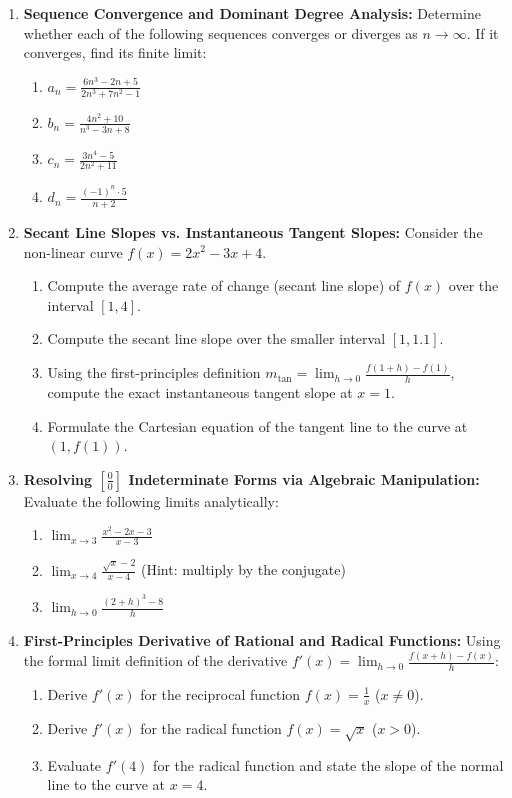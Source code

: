 \begin{enumerate}
    \item \textbf{Sequence Convergence and Dominant Degree Analysis:} Determine whether each of the following sequences converges or diverges as $n \to \infty$. If it converges, find its finite limit:
    \begin{enumerate}
        \item $a_n = \frac{6n^3 - 2n + 5}{2n^3 + 7n^2 - 1}$
        \item $b_n = \frac{4n^2 + 10}{n^3 - 3n + 8}$
        \item $c_n = \frac{3n^4 - 5}{2n^2 + 11}$
        \item $d_n = \frac{(-1)^n \cdot 5}{n + 2}$
    \end{enumerate}

    \item \textbf{Secant Line Slopes vs. Instantaneous Tangent Slopes:} Consider the non-linear curve $f(x) = 2x^2 - 3x + 4$.
    \begin{enumerate}
        \item Compute the average rate of change (secant line slope) of $f(x)$ over the interval $[1, 4]$.
        \item Compute the secant line slope over the smaller interval $[1, 1.1]$.
        \item Using the first-principles definition $m_{\text{tan}} = \lim_{h \to 0} \frac{f(1+h) - f(1)}{h}$, compute the exact instantaneous tangent slope at $x = 1$.
        \item Formulate the Cartesian equation of the tangent line to the curve at $(1, f(1))$.
    \end{enumerate}

    \item \textbf{Resolving $\left[\frac{0}{0}\right]$ Indeterminate Forms via Algebraic Manipulation:} Evaluate the following limits analytically:
    \begin{enumerate}
        \item $\lim_{x \to 3} \frac{x^2 - 2x - 3}{x - 3}$
        \item $\lim_{x \to 4} \frac{\sqrt{x} - 2}{x - 4}$ (Hint: multiply by the conjugate)
        \item $\lim_{h \to 0} \frac{(2 + h)^3 - 8}{h}$
    \end{enumerate}

    \item \textbf{First-Principles Derivative of Rational and Radical Functions:} Using the formal limit definition of the derivative $f'(x) = \lim_{h \to 0} \frac{f(x+h) - f(x)}{h}$:
    \begin{enumerate}
        \item Derive $f'(x)$ for the reciprocal function $f(x) = \frac{1}{x}$ ($x \neq 0$).
        \item Derive $f'(x)$ for the radical function $f(x) = \sqrt{x}$ ($x > 0$).
        \item Evaluate $f'(4)$ for the radical function and state the slope of the normal line to the curve at $x = 4$.
    \end{enumerate}


\end{enumerate}
